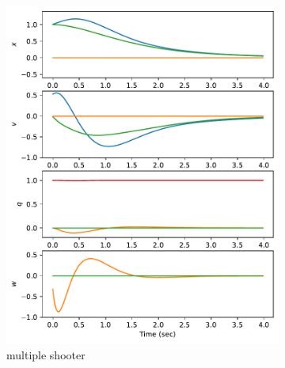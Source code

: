 \documentclass[]{article}
\begin{document}
\begin{figure}[H]
	\centering
	\begin{subfigure}[b]{0.3\textwidth}
		\centering
		\includegraphics[width=\textwidth]{figures/statex1z1vx3.pdf}
		\caption{multiple shooter}
	\end{subfigure}
	\begin{subfigure}[b]{0.3\textwidth}
		\centering

\end{subfigure}
\end{figure}
\end{document}
